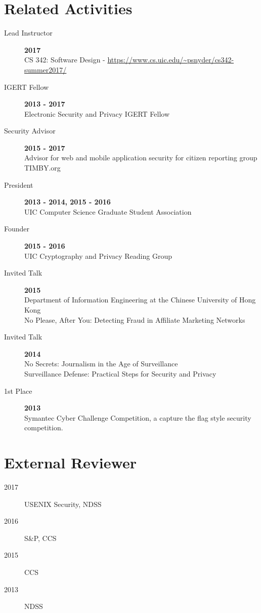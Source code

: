 \documentclass{vitae}
\begin{document}
  \section{Related Activities}
  \begin{description}

    \item[Lead Instructor] \hfill \textbf{2017}\\
        CS 342: Software Design - \url{https://www.cs.uic.edu/~psnyder/cs342-summer2017/}

    \item[IGERT Fellow] \hfill \textbf{2013 - 2017}\\
    Electronic Security and Privacy IGERT Fellow

    \item[Security Advisor] \hfill \textbf{2015 - 2017}\\
    Advisor for web and mobile application security for citizen reporting group TIMBY.org

    \item[President] \hfill \textbf{2013 - 2014, 2015 - 2016}\\
    UIC Computer Science Graduate Student Association

    \item[Founder] \hfill \textbf{2015 - 2016}\\
    UIC Cryptography and Privacy Reading Group

    \item[Invited Talk] \hfill \textbf{2015}\\
    Department of Information Engineering at the Chinese University of Hong Kong\\
    No Please, After You: Detecting Fraud in Affiliate Marketing Networks

    \item[Invited Talk] \hfill \textbf{2014}\\
    No Secrets: Journalism in the Age of Surveillance\\
    Surveillance Defense: Practical Steps for Security and Privacy

    \item[1st Place] \hfill \textbf{2013}\\
    Symantec Cyber Challenge Competition, a capture the flag style security competition.
  \end{description}

  \section{External Reviewer}
  \begin{description}
    \item [2017] USENIX Security, NDSS
    \item [2016] S\&P, CCS
    \item [2015] CCS
    \item [2013] NDSS
  \end{description}
\end{document}
